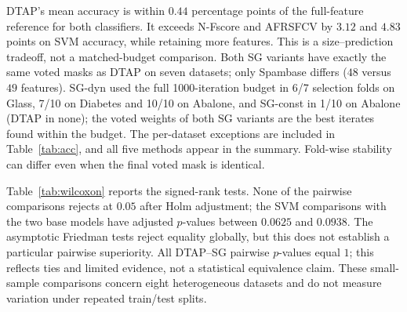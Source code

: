 \documentclass[]{interact}
\theoremstyle{plain}
\theoremstyle{definition}
\theoremstyle{remark}
\begin{document}
DTAP's mean accuracy is within $0.44$ percentage points of the full-feature
reference for both classifiers. It exceeds N-Fscore and AFRSFCV by $3.12$
and $4.83$ points on SVM accuracy, while retaining more features.
This is a size--prediction tradeoff, not a matched-budget comparison.
Both SG variants have exactly the same voted masks as DTAP on seven datasets;
only Spambase differs ($48$ versus $49$ features).
SG-dyn used the full 1000-iteration budget in 6/7 selection folds on Glass,
7/10 on Diabetes and 10/10 on Abalone, and SG-const in 1/10 on Abalone
(DTAP in none); the voted weights of both SG variants are the best iterates
found within the budget. The per-dataset exceptions
are included in Table~\ref{tab:acc}, and all five methods appear in the summary.
Fold-wise stability can differ even when the final voted mask is identical.

Table~\ref{tab:wilcoxon} reports the signed-rank tests. None of the pairwise
comparisons rejects at $0.05$ after Holm adjustment; the SVM comparisons with
the two base models have adjusted $p$-values between $0.0625$ and $0.0938$.
The asymptotic Friedman tests reject equality globally, but this does not establish
a particular pairwise superiority. All DTAP--SG pairwise $p$-values equal $1$;
this reflects ties and limited evidence, not a statistical equivalence claim.
These small-sample comparisons concern eight heterogeneous datasets and do not
measure variation under repeated train/test splits.
\end{document}
